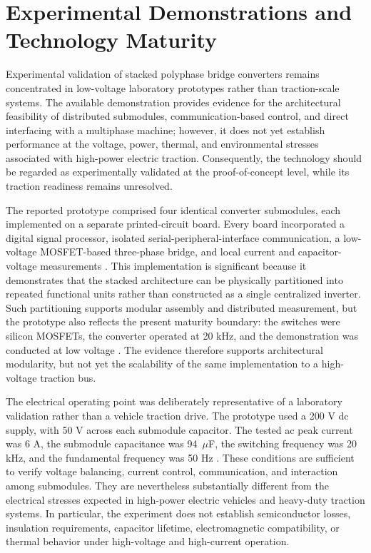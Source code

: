 \section{Experimental Demonstrations and Technology Maturity}

Experimental validation of stacked polyphase bridge converters remains concentrated in low-voltage laboratory prototypes rather than traction-scale systems. The available demonstration provides evidence for the architectural feasibility of distributed submodules, communication-based control, and direct interfacing with a multiphase machine; however, it does not yet establish performance at the voltage, power, thermal, and environmental stresses associated with high-power electric traction. Consequently, the technology should be regarded as experimentally validated at the proof-of-concept level, while its traction readiness remains unresolved.

The reported prototype comprised four identical converter submodules, each implemented on a separate printed-circuit board. Every board incorporated a digital signal processor, isolated serial-peripheral-interface communication, a low-voltage MOSFET-based three-phase bridge, and local current and capacitor-voltage measurements \cite{Jin2017}. This implementation is significant because it demonstrates that the stacked architecture can be physically partitioned into repeated functional units rather than constructed as a single centralized inverter. Such partitioning supports modular assembly and distributed measurement, but the prototype also reflects the present maturity boundary: the switches were silicon MOSFETs, the converter operated at 20 kHz, and the demonstration was conducted at low voltage \cite{Jin2017}. The evidence therefore supports architectural modularity, but not yet the scalability of the same implementation to a high-voltage traction bus.

The electrical operating point was deliberately representative of a laboratory validation rather than a vehicle traction drive. The prototype used a 200 V dc supply, with 50 V across each submodule capacitor. The tested ac peak current was 6 A, the submodule capacitance was 94~$\mu$F, the switching frequency was 20 kHz, and the fundamental frequency was 50 Hz \cite{Jin2017}. These conditions are sufficient to verify voltage balancing, current control, communication, and interaction among submodules. They are nevertheless substantially different from the electrical stresses expected in high-power electric vehicles and heavy-duty traction systems. In particular, the experiment does not establish semiconductor losses, insulation requirements, capacitor lifetime, electromagnetic compatibility, or thermal behavior under high-voltage and high-current operation. %


